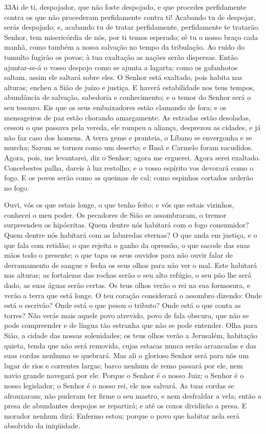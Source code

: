 \medskip

\lettrine{33}{}Ai de ti, despojador, que não foste despojado, e
que procedes perfidamente contra os que não procederam perfidamente
contra ti! Acabando tu de despojar, serás despojado; e, acabando tu
de tratar perfidamente, perfidamente te tratarão. Senhor, tem
misericórdia de nós, por ti temos esperado; sê tu o nosso braço cada
manhã, como também a nossa salvação no tempo da tribulação. Ao
ruído do tumulto fugirão os povos; à tua exaltação as nações serão
dispersas. Então ajuntar-se-á o vosso despojo como se ajunta a
lagarta; como os gafanhotos saltam, assim ele saltará sobre eles.
O Senhor está exaltado, pois habita nas alturas; encheu a Sião
de juízo e justiça. E haverá estabilidade nos teus tempos,
abundância de salvação, sabedoria e conhecimento; e o temor do
Senhor será o seu tesouro. Eis que os seus embaixadores estão
clamando de fora; e os mensageiros de paz estão chorando
amargamente. As estradas estão desoladas, cessou o que passava
pela vereda, ele rompeu a aliança, desprezou as cidades, e já não
faz caso dos homens. A terra geme e pranteia, o Líbano se
envergonha e se murcha; Sarom se tornou como um deserto; e Basã e
Carmelo foram sacudidos. Agora, pois, me levantarei, diz o
Senhor; agora me erguerei. Agora serei exaltado. Concebestes
palha, dareis à luz restolho; e o vosso espírito vos devorará como o
fogo. E os povos serão como as queimas de cal; como espinhos
cortados arderão no fogo.

Ouvi, vós os que estais longe, o que tenho feito; e vós que
estais vizinhos, conhecei o meu poder. Os pecadores de Sião
se assombraram, o tremor surpreendeu os hipócritas. Quem dentre nós
habitará com o fogo consumidor? Quem dentre nós habitará com as
labaredas eternas? O que anda em justiça, e o que fala com
retidão; o que rejeita o ganho da opressão, o que sacode das suas
mãos todo o presente; o que tapa os seus ouvidos para não ouvir
falar de derramamento de sangue e fecha os seus olhos para não ver o
mal. Este habitará nas alturas; as fortalezas das rochas
serão o seu alto refúgio, o seu pão lhe será dado, as suas águas
serão certas. Os teus olhos verão o rei na sua formosura, e
verão a terra que está longe. O teu coração considerará o
assombro dizendo: Onde está o escrivão? Onde está o que pesou o
tributo? Onde está o que conta as torres? Não verás mais
aquele povo atrevido, povo de fala obscura, que não se pode
compreender e de língua tão estranha que não se pode entender.
Olha para Sião, a cidade das nossas solenidades; os teus
olhos verão a Jerusalém, habitação quieta, tenda que não será
removida, cujas estacas nunca serão arrancadas e das suas cordas
nenhuma se quebrará. Mas ali o glorioso Senhor será para nós
um lugar de rios e correntes largas; barco nenhum de remo passará
por ele, nem navio grande navegará por ele. Porque o Senhor é
o nosso Juiz; o Senhor é o nosso legislador; o Senhor é o nosso rei,
ele nos salvará. As tuas cordas se afrouxaram; não puderam
ter firme o seu mastro, e nem desfraldar a vela; então a presa de
abundantes despojos se repartirá; e até os coxos dividirão a presa.
E morador nenhum dirá: Enfermo estou; porque o povo que
habitar nela será absolvido da iniqüidade.

